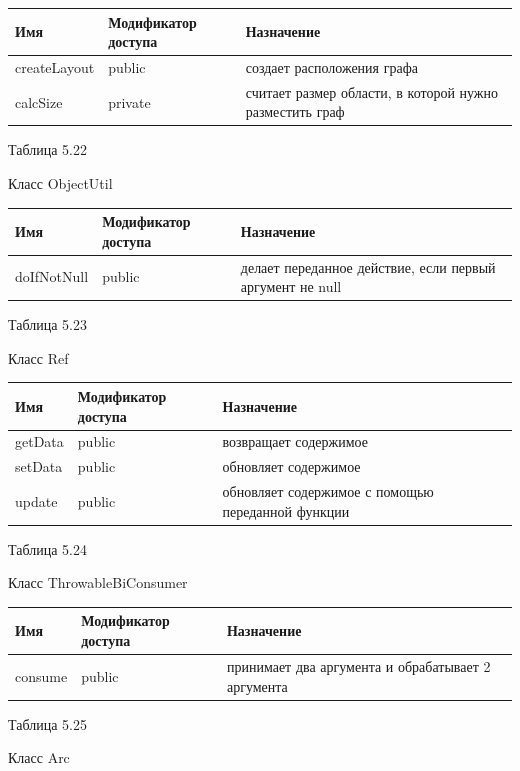 \documentclass{../TechDoc}
\begin{document}
	\begin{tabular}{|p{5cm}|p{5cm}|p{5cm}|}
		\hline
		\textbf{Имя} & \textbf{Модификатор доступа} & \textbf{Назначение} \\
		\hline
		createLayout& public & создает расположения графа\\
		\hline
		calcSize& private & считает размер области, в которой нужно разместить граф\\
		
		\hline
	\end{tabular}
	\begin{flushright}
		Таблица 5.22
	\end{flushright}
	Класс ObjectUtil
	
	\begin{tabular}{|p{5cm}|p{5cm}|p{5cm}|}
		\hline
		\textbf{Имя} & \textbf{Модификатор доступа} & \textbf{Назначение} \\
		\hline
		doIfNotNull& public& делает переданное действие, если первый аргумент не null\\
		
		\hline
	\end{tabular}
	\begin{flushright}
		Таблица 5.23
	\end{flushright}
	Класс Ref
	
	\begin{tabular}{|p{5cm}|p{5cm}|p{5cm}|}
		\hline
		\textbf{Имя} & \textbf{Модификатор доступа} & \textbf{Назначение} \\
		\hline
		getData& public & возвращает содержимое\\
		\hline
		setData&public & обновляет содержимое\\
		\hline
		update&public & обновляет содержимое с помощью переданной функции\\
		
		\hline
	\end{tabular}
	\begin{flushright}
		Таблица 5.24
	\end{flushright}
	Класс ThrowableBiConsumer
	
	\begin{tabular}{|p{5cm}|p{5cm}|p{5cm}|}
		\hline
		\textbf{Имя} & \textbf{Модификатор доступа} & \textbf{Назначение} \\
		\hline
		consume& public& принимает два аргумента и обрабатывает 2 аргумента\\
		
		\hline
	\end{tabular}
	\begin{flushright}
		Таблица 5.25
	\end{flushright}
	Класс Arc
	
\end{document}
